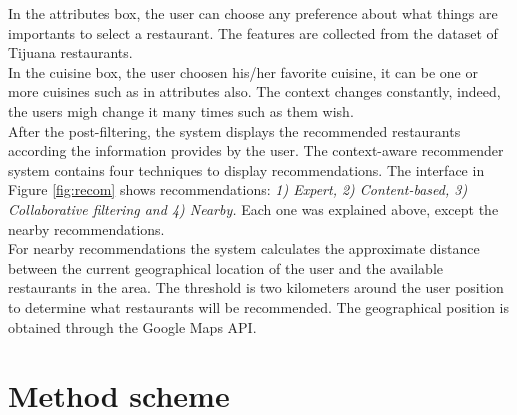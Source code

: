 In the attributes box, the user can choose any preference about what
things are importants to select a restaurant. The features are
collected from the dataset of Tijuana restaurants. \\In the cuisine box,
the user choosen his/her favorite cuisine, it can be one or more
cuisines such as in attributes  also.
The context changes constantly, indeed, the users migh change 
it many times such as them wish.\\ 
After the post-filtering, the system displays the  recommended
restaurants according the information provides by the user. The
context-aware recommender system contains four techniques to display
recommendations. The interface in Figure  \ref{fig:recom} shows
recommendations: \textit{1) Expert, 2) Content-based, 3) Collaborative
filtering and 4) Nearby.} Each one was explained above, except the
nearby recommendations. \\ For nearby recommendations the system
calculates the approximate distance between the current geographical
location of the user and the available restaurants in the area.  The
threshold is two kilometers around the user position to determine what
restaurants will be recommended. The geographical position is
obtained through the Google Maps API.

\section{Method scheme} 

